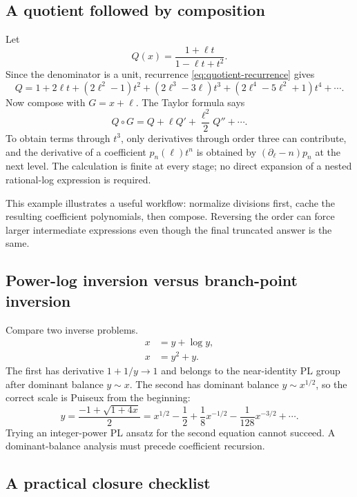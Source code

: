\documentclass[11pt,oneside]{article}
\numberwithin{equation}{section}
\theoremstyle{definition}
\newcommand{\dlog}{\partial_{\ell}}
\begin{document}
\subsection{A quotient followed by composition}

Let
\[
  Q(x)=\frac{1+\ell t}{1-\ell t+t^2}.
\]
Since the denominator is a unit, recurrence \eqref{eq:quotient-recurrence}
gives
\begin{equation}\label{eq:worked-Q}
  Q=1+2\ell t+(2\ell^2-1)t^2
    +(2\ell^3-3\ell)t^3
    +(2\ell^4-5\ell^2+1)t^4+\cdots.
\end{equation}
Now compose with \(G=x+\ell\).  The Taylor formula says
\[
  Q\circ G=Q+\ell Q'+\frac{\ell^2}{2}Q''+\cdots.
\]
To obtain terms through \(t^3\), only derivatives through order three can
contribute, and the derivative of a coefficient \(p_n(\ell)t^n\) is obtained by
\((\dlog-n)p_n\) at the next level.  The calculation is finite at every stage;
no direct expansion of a nested rational-log expression is required.

This example illustrates a useful workflow: normalize divisions first, cache
the resulting coefficient polynomials, then compose.  Reversing the order can
force larger intermediate expressions even though the final truncated answer is
the same.

\subsection{Power-log inversion versus branch-point inversion}

Compare two inverse problems.
\begin{align*}
  x&=y+\log y,\\
  x&=y^2+y.
\end{align*}
The first has derivative \(1+1/y\to1\) and belongs to the near-identity PL
group after dominant balance \(y\sim x\).  The second has dominant balance
\(y\sim x^{1/2}\), so the correct scale is Puiseux from the beginning:
\[
  y=\frac{-1+\sqrt{1+4x}}2
   =x^{1/2}-\frac12+\frac{1}{8}x^{-1/2}
    -\frac{1}{128}x^{-3/2}+\cdots.
\]
Trying an integer-power PL ansatz for the second equation cannot succeed.  A
dominant-balance analysis must precede coefficient recursion.

\subsection{A practical closure checklist}
\end{document}
